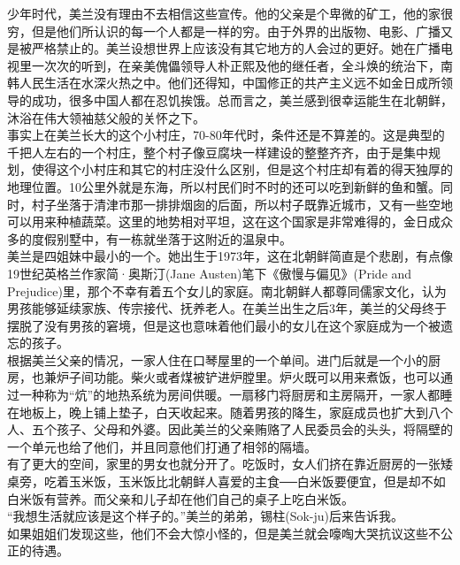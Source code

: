\begin{multicols}{\theparacolNo}
少年时代，美兰没有理由不去相信这些宣传。他的父亲是个卑微的矿工，他的家很穷，但是他们所认识的每一个人都是一样的穷。由于外界的出版物、电影、广播又是被严格禁止的。美兰设想世界上应该没有其它地方的人会过的更好。她在广播电视里一次次的听到，在亲美傀儡领导人朴正熙及他的继任者，全斗焕的统治下，南韩人民生活在水深火热之中。他们还得知，中国修正的共产主义远不如金日成所领导的成功，很多中国人都在忍饥挨饿。总而言之，美兰感到很幸运能生在北朝鲜，沐浴在伟大领袖慈父般的关怀之下。\\

事实上在美兰长大的这个小村庄，70-80年代时，条件还是不算差的。这是典型的千把人左右的一个村庄，整个村子像豆腐块一样建设的整整齐齐，由于是集中规划，使得这个小村庄和其它的村庄没什么区别，但是这个村庄却有着的得天独厚的地理位置。10公里外就是东海，所以村民们时不时的还可以吃到新鲜的鱼和蟹。同时，村子坐落于清津市那一排排烟囱的后面，所以村子既靠近城市，又有一些空地可以用来种植蔬菜。这里的地势相对平坦，这在这个国家是非常难得的，金日成众多的度假别墅中，有一栋就坐落于这附近的温泉中。\\

美兰是四姐妹中最小的一个。她出生于1973年，这在北朝鲜简直是个悲剧，有点像19世纪英格兰作家简·奥斯汀(Jane Austen)笔下《傲慢与偏见》(Pride and Prejudice)里，那个不幸有着五个女儿的家庭。南北朝鲜人都尊同儒家文化，认为男孩能够延续家族、传宗接代、抚养老人。在美兰出生之后3年，美兰的父母终于摆脱了没有男孩的窘境，但是这也意味着他们最小的女儿在这个家庭成为一个被遗忘的孩子。\\

根据美兰父亲的情况，一家人住在口琴屋里的一个单间。进门后就是一个小的厨房，也兼炉子间功能。柴火或者煤被铲进炉膛里。炉火既可以用来煮饭，也可以通过一种称为“炕”的地热系统为房间供暖。一扇移门将厨房和主房隔开，一家人都睡在地板上，晚上铺上垫子，白天收起来。随着男孩的降生，家庭成员也扩大到八个人、五个孩子、父母和外婆。因此美兰的父亲贿赂了人民委员会的头头，将隔壁的一个单元也给了他们，并且同意他们打通了相邻的隔墙。\\

有了更大的空间，家里的男女也就分开了。吃饭时，女人们挤在靠近厨房的一张矮桌旁，吃着玉米饭，玉米饭比北朝鲜人喜爱的主食──白米饭要便宜，但是却不如白米饭有营养。而父亲和儿子却在他们自己的桌子上吃白米饭。\\

“我想生活就应该是这个样子的。”美兰的弟弟，锡柱(Sok-ju)后来告诉我。\\

如果姐姐们发现这些，他们不会大惊小怪的，但是美兰就会嚎啕大哭抗议这些不公正的待遇。\\


\end{multicols}
